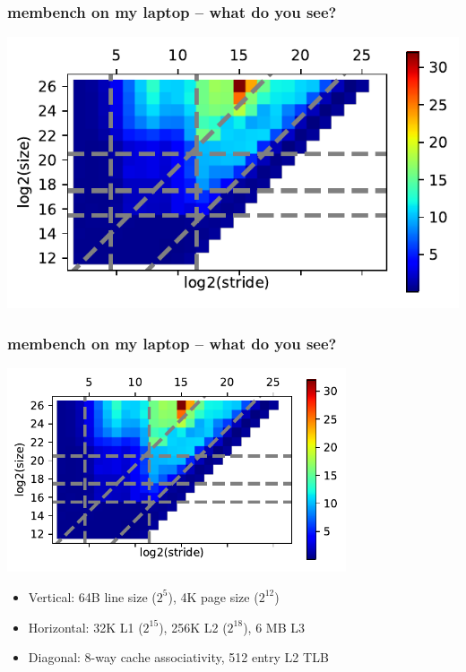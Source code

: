 \documentclass{beamer}
\begin{document}
\begin{frame}
  \frametitle{membench on my laptop -- what do you see?}

  \begin{center}
    \includegraphics[width=\textwidth]{figs/membench/timings_laptop-heat.pdf}
  \end{center}
\end{frame}


\begin{frame}
  \frametitle{membench on my laptop -- what do you see?}

  \begin{center}
    \includegraphics[width=0.75\textwidth]{figs/membench/timings_laptop-heat.pdf}
  \end{center}
  \begin{itemize}
    \item Vertical: 64B line size ($2^5$), 4K page size ($2^{12}$)
    \item Horizontal: 32K L1 ($2^{15}$), 256K L2 ($2^{18}$), 6 MB L3
    \item Diagonal: 8-way cache associativity, 512 entry L2 TLB
  \end{itemize}
\end{frame}
\end{document}
